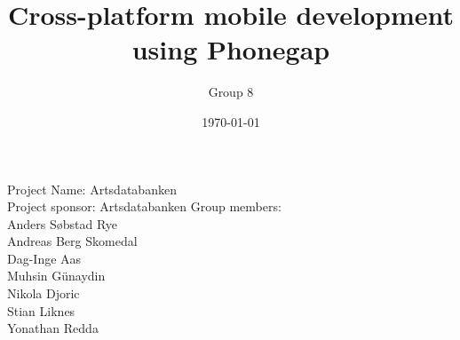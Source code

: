 \documentclass[a4paper]{article}
\begin{document}
	\title{Cross-platform mobile development using Phonegap}
	\author{Group 8}
	\date{\today}
	\maketitle
	\pagebreak
	\begin{center}
		Project Name: Artsdatabanken \\
		Project sponsor: Artsdatabanken
    Group members: \\
    Anders Søbstad Rye\\
    Andreas Berg Skomedal\\
    Dag-Inge Aas\\
    Muhsin Günaydin\\
    Nikola Djoric\\
    Stian Liknes\\
    Yonathan Redda
	\end{center}
	\newpage

	\tableofcontents
	\listoffigures
	\listoftables

	\newpage
	

	\newpage
	

	\newpage
	

	\newpage
	

	\nocite{*}
	
	
\end{document}
